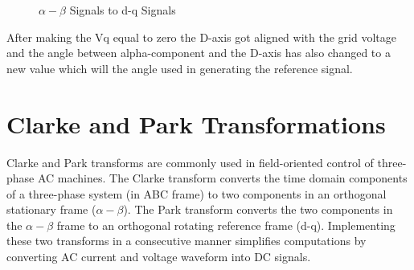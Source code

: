 \documentclass[12pt,a4paper]{book}
\begin{document}
\begin{figure}[h]
  \centering

  \hfill

  \caption{\(\alpha - \beta\) Signals to d-q Signals}
  \label{fig:image15}
\end{figure}

After making the Vq equal to zero the D-axis got aligned with the grid voltage and the angle between alpha-component and the D-axis has also changed to a new value which will the angle used in generating the reference signal.

\section{Clarke and Park Transformations}
Clarke and Park transforms are commonly used in field-oriented control of three-phase AC machines. The Clarke transform converts the time domain components of a three-phase system (in ABC frame) to two components in an orthogonal stationary frame (\(\alpha - \beta\)). The Park transform converts the two components in the \(\alpha - \beta\) frame to an orthogonal rotating reference frame (d-q). Implementing these two transforms in a consecutive manner simplifies computations by converting AC current and voltage waveform into DC signals.
\end{document}

